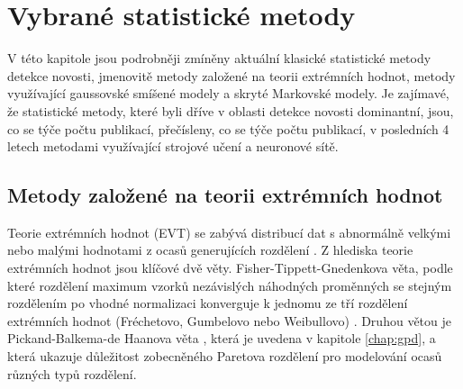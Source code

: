 \section{Vybrané statistické metody}
V této kapitole jsou podrobněji zmíněny aktuální klasické statistické metody detekce novosti, jmenovitě metody založené na teorii extrémních hodnot, metody využívající gaussovské smíšené modely a skryté Markovské modely. Je zajímavé, že statistické metody, které byli dříve v oblasti detekce novosti dominantní, jsou, co se týče počtu publikací, přečísleny, co se týče počtu publikací, v posledních 4 letech metodami využívající strojové učení a neuronové sítě.
\subsection{Metody založené na teorii extrémních hodnot}
Teorie extrémních hodnot (EVT) se zabývá distribucí dat s abnormálně velkými nebo malými hodnotami z ocasů generujících rozdělení \cite{evt1}. Z hlediska teorie extrémních hodnot jsou klíčové dvě věty. Fisher-Tippett-Gnedenkova věta, podle které rozdělení maximum vzorků nezávislých náhodných proměnných se stejným rozdělením po vhodné normalizaci konverguje k jednomu ze tří rozdělení extrémních hodnot (Fréchetovo, Gumbelovo nebo Weibullovo) \cite{evt2}. Druhou větou je Pickand-Balkema-de Haanova věta \cite{gpd5,gpd6}, která je uvedena v kapitole \ref{chap:gpd}, a která ukazuje důležitost zobecněného Paretova rozdělení pro modelování ocasů různých typů rozdělení.
\par 
